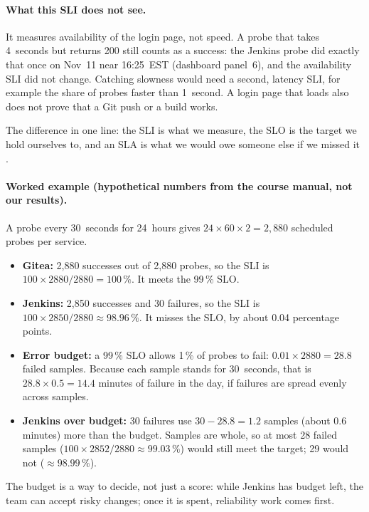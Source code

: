 \paragraph{What this SLI does not see.} It measures availability of the login page, not speed. A probe that takes
4~seconds but returns 200 still counts as a success: the Jenkins probe did exactly that once on Nov~11 near 16:25~EST
(dashboard panel~6), and the availability SLI did not change. Catching slowness would need a second, latency SLI, for
example the share of probes faster than 1~second. A login page that loads also does not prove that a Git push or a build works.

The difference in one line: the SLI is what we measure, the SLO is the target we hold ourselves to, and an SLA is what we would owe
someone else if we missed it \cite{GoogleSREWorkbookSLO}.

\paragraph{Worked example (hypothetical numbers from the course manual, not our results).}
A probe every 30~seconds for 24~hours gives $24 \times 60 \times 2 = 2{,}880$ scheduled probes per service.
\begin{itemize}[nosep]
  \item \textbf{Gitea:} 2,880 successes out of 2,880 probes, so the SLI is $100 \times 2880/2880 = 100\,\%$. It meets the 99\,\% SLO.
  \item \textbf{Jenkins:} 2,850 successes and 30 failures, so the SLI is $100 \times 2850/2880 \approx 98.96\,\%$. It misses the SLO, by about 0.04 percentage points.
  \item \textbf{Error budget:} a 99\,\% SLO allows 1\,\% of probes to fail: $0.01 \times 2880 = 28.8$ failed samples. Because each sample stands for 30~seconds, that is $28.8 \times 0.5 = 14.4$ minutes of failure in the day, if failures are spread evenly across samples.
  \item \textbf{Jenkins over budget:} 30 failures use $30 - 28.8 = 1.2$ samples (about 0.6 minutes) more than the budget. Samples are whole, so at most 28 failed samples ($100 \times 2852/2880 \approx 99.03\,\%$) would still meet the target; 29 would not ($\approx 98.99\,\%$).
\end{itemize}
The budget is a way to decide, not just a score: while Jenkins has budget left, the team can accept risky changes; once it is
spent, reliability work comes first.

